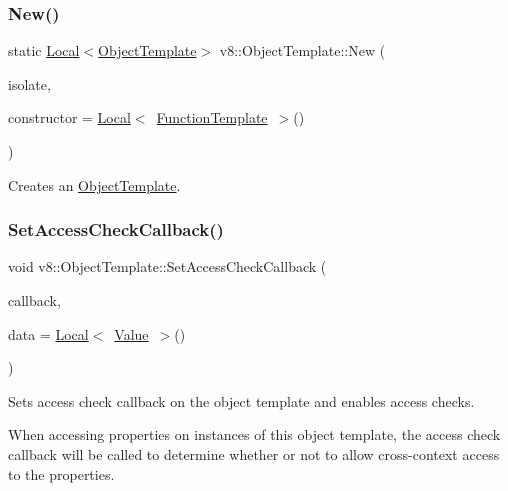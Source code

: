 \subsubsection{\texorpdfstring{New()}{New()}}
{\footnotesize\ttfamily static \mbox{\hyperlink{classv8_1_1Local}{Local}}$<$\mbox{\hyperlink{classv8_1_1ObjectTemplate}{Object\+Template}}$>$ v8\+::\+Object\+Template\+::\+New (\begin{DoxyParamCaption}\item[{\mbox{\hyperlink{classv8_1_1Isolate}{Isolate}} $\ast$}]{isolate,  }\item[{\mbox{\hyperlink{classv8_1_1Local}{Local}}$<$ \mbox{\hyperlink{classv8_1_1FunctionTemplate}{Function\+Template}} $>$}]{constructor = {\ttfamily \mbox{\hyperlink{classv8_1_1Local}{Local}}$<$~\mbox{\hyperlink{classv8_1_1FunctionTemplate}{Function\+Template}}~$>$()} }\end{DoxyParamCaption})\hspace{0.3cm}{\ttfamily [static]}}

Creates an \mbox{\hyperlink{classv8_1_1ObjectTemplate}{Object\+Template}}. \mbox{\label{classv8_1_1ObjectTemplate_a5b0337016cd89fc72f3a9d75399c2487}} 
\subsubsection{\texorpdfstring{Set\+Access\+Check\+Callback()}{SetAccessCheckCallback()}}
{\footnotesize\ttfamily void v8\+::\+Object\+Template\+::\+Set\+Access\+Check\+Callback (\begin{DoxyParamCaption}\item[{\mbox{\hyperlink{namespacev8_a1024fb358d107c1494163217830688e6}{Access\+Check\+Callback}}}]{callback,  }\item[{\mbox{\hyperlink{classv8_1_1Local}{Local}}$<$ \mbox{\hyperlink{classv8_1_1Value}{Value}} $>$}]{data = {\ttfamily \mbox{\hyperlink{classv8_1_1Local}{Local}}$<$~\mbox{\hyperlink{classv8_1_1Value}{Value}}~$>$()} }\end{DoxyParamCaption})}

Sets access check callback on the object template and enables access checks.

When accessing properties on instances of this object template, the access check callback will be called to determine whether or not to allow cross-\/context access to the properties. \mbox{\label{classv8_1_1ObjectTemplate_abb8302671bfb5d381f7415336f4e631d}} 
